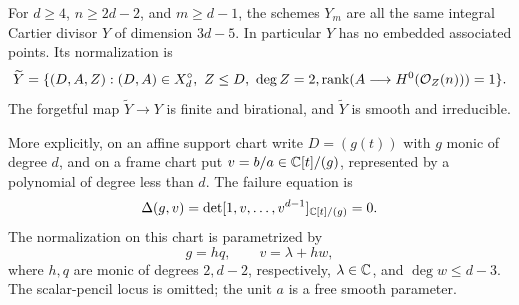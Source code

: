 \begin{theorem}
\label{thm:moving-normalization}
For $d\ge4$, $n\ge2d-2$, and $m\ge d-1$, the schemes $Y_m$
are all the same integral Cartier divisor $Y$ of dimension $3d-5$.
In particular $Y$ has no embedded associated points. Its normalization is
\begin{equation}\label{eq:contact-normalization-incidence}
 \widetilde Y=
 \{(D,A,Z): (D,A)\in X_d^\circ,\ Z\le D,\ \deg Z=2,
                  \operatorname{rank}(A\longrightarrow H^0(\mathcal O_Z(n)))=1\}.
\end{equation}
The forgetful map $\widetilde Y\to Y$ is finite and birational,
and $\widetilde Y$ is smooth and irreducible.

More explicitly, on an affine support chart write $D=(g(t))$ with
$g$ monic of degree $d$, and on a frame chart put $v=b/a\in\mathbb C[t]/(g)$,
represented by a polynomial of degree less than $d$. The failure
equation is
\begin{equation}\label{eq:moving-power-determinant}
 \Delta(g,v)=\det[1,v,\ldots,v^{d-1}]_{\mathbb C[t]/(g)}=0.
\end{equation}
The normalization on this chart is parametrized by
\begin{equation}\label{eq:moving-explicit-normalization}
 g=hq,\qquad v=\lambda+hw,
\end{equation}
where $h,q$ are monic of degrees $2,d-2$, respectively,
$\lambda\in\mathbb C$, and $\deg w\le d-3$. The scalar-pencil locus
is omitted; the unit $a$ is a free smooth parameter.
\end{theorem}
